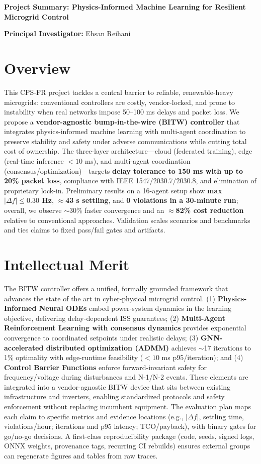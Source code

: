 \documentclass[10pt]{article}
\begin{document}
\textbf{\large Project Summary: Physics-Informed Machine Learning for Resilient Microgrid Control}

\textbf{Principal Investigator:} Ehsan Reihani

\section*{Overview}

This CPS-FR project tackles a central barrier to reliable, renewable-heavy microgrids: conventional controllers are costly, vendor-locked, and prone to instability when real networks impose 50--100 ms delays and packet loss. We propose a \textbf{vendor-agnostic bump-in-the-wire (BITW) controller} that integrates physics-informed machine learning with multi-agent coordination to preserve stability and safety under adverse communications while cutting total cost of ownership. The three-layer architecture---cloud (federated training), edge (real-time inference $<10$ ms), and multi-agent coordination (consensus/optimization)---targets \textbf{delay tolerance to 150 ms with up to 20\% packet loss}, compliance with IEEE 1547/2030.7/2030.8, and elimination of proprietary lock-in. Preliminary results on a 16-agent setup show \textbf{max $|\Delta f| \leq 0.30$ Hz}, \textbf{$\approx$43 s settling}, and \textbf{0 violations in a 30-minute run}; overall, we observe $\sim$30\% faster convergence and an \textbf{$\approx$82\% cost reduction} relative to conventional approaches. Validation scales scenarios and benchmarks and ties claims to fixed pass/fail gates and artifacts.

\section*{Intellectual Merit}

The BITW controller offers a unified, formally grounded framework that advances the state of the art in cyber-physical microgrid control. (1) \textbf{Physics-Informed Neural ODEs} embed power-system dynamics in the learning objective, delivering delay-dependent ISS guarantees; (2) \textbf{Multi-Agent Reinforcement Learning with consensus dynamics} provides exponential convergence to coordinated setpoints under realistic delays; (3) \textbf{GNN-accelerated distributed optimization (ADMM)} achieves $\sim$17 iterations to 1\% optimality with edge-runtime feasibility ($<10$ ms p95/iteration); and (4) \textbf{Control Barrier Functions} enforce forward-invariant safety for frequency/voltage during disturbances and N-1/N-2 events. These elements are integrated into a vendor-agnostic BITW device that sits between existing infrastructure and inverters, enabling standardized protocols and safety enforcement without replacing incumbent equipment. The evaluation plan maps each claim to specific metrics and evidence locations (e.g., $|\Delta f|$, settling time, violations/hour; iterations and p95 latency; TCO/payback), with binary gates for go/no-go decisions. A first-class reproducibility package (code, seeds, signed logs, ONNX weights, provenance tags, recurring CI rebuilds) ensures external groups can regenerate figures and tables from raw traces.
\end{document}
